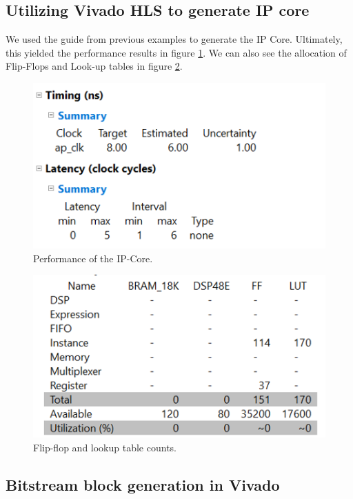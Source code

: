 \documentclass[a4paper,12pt]{report}    %
\begin{document}
\subsection{Utilizing Vivado HLS to generate IP core}

We used the guide from previous examples to generate the IP Core. Ultimately, this yielded the performance results in figure \ref{FIG::27::PERFORMANCE}. We can also see the allocation of Flip-Flops and Look-up tables in figure \ref{FIG::27::TRANSISTOR}.


\begin{figure}[H]
  \centering
  \includegraphics[scale=1]{latex/figures/ass2_27_performance.png}
  \caption{Performance of the IP-Core.}
  \label{FIG::27::PERFORMANCE}
\end{figure}
\begin{figure}[H]
  \centering
  \includegraphics[scale=1]{latex/figures/ass2_27_hls_transistor_.png}
  \caption{Flip-flop and lookup table counts.}
  \label{FIG::27::TRANSISTOR}
\end{figure}

\subsection{Bitstream block generation in Vivado}
\end{document}
